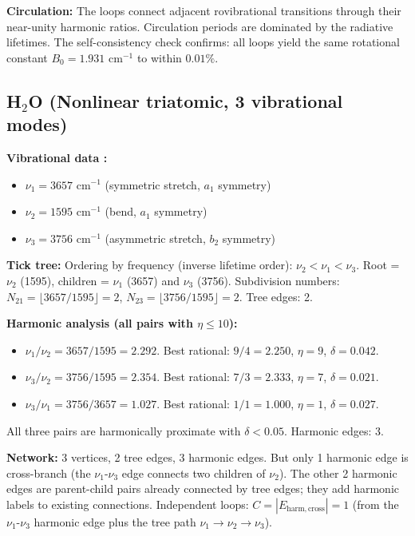 \documentclass[11pt,twocolumn,a4paper]{article}
\theoremstyle{definition}
\theoremstyle{remark}
\begin{document}
\textbf{Circulation:} The loops connect adjacent rovibrational transitions through their near-unity harmonic ratios. Circulation periods are dominated by the radiative lifetimes. The self-consistency check confirms: all loops yield the same rotational constant $B_0 = 1.931$ cm$^{-1}$ to within $0.01\%$.

\subsection{H$_2$O (Nonlinear triatomic, 3 vibrational modes)}

\textbf{Vibrational data \citep{shimanouchi1972, nist_webbook}:}
\begin{itemize}[nosep]
\item $\nu_1 = 3657$ cm$^{-1}$ (symmetric stretch, $a_1$ symmetry)
\item $\nu_2 = 1595$ cm$^{-1}$ (bend, $a_1$ symmetry)
\item $\nu_3 = 3756$ cm$^{-1}$ (asymmetric stretch, $b_2$ symmetry)
\end{itemize}

\textbf{Tick tree:} Ordering by frequency (inverse lifetime order): $\nu_2 < \nu_1 < \nu_3$. Root = $\nu_2$ (1595), children = $\nu_1$ (3657) and $\nu_3$ (3756). Subdivision numbers: $N_{21} = \lfloor 3657/1595 \rfloor = 2$, $N_{23} = \lfloor 3756/1595 \rfloor = 2$. Tree edges: 2.

\textbf{Harmonic analysis (all pairs with $\eta \leq 10$):}

\begin{itemize}[nosep]
\item $\nu_1/\nu_2 = 3657/1595 = 2.292$. Best rational: $9/4 = 2.250$, $\eta = 9$, $\delta = 0.042$.
\item $\nu_3/\nu_2 = 3756/1595 = 2.354$. Best rational: $7/3 = 2.333$, $\eta = 7$, $\delta = 0.021$.
\item $\nu_3/\nu_1 = 3756/3657 = 1.027$. Best rational: $1/1 = 1.000$, $\eta = 1$, $\delta = 0.027$.
\end{itemize}

All three pairs are harmonically proximate with $\delta < 0.05$. Harmonic edges: 3.

\textbf{Network:} 3 vertices, 2 tree edges, 3 harmonic edges. But only 1 harmonic edge is cross-branch (the $\nu_1$-$\nu_3$ edge connects two children of $\nu_2$). The other 2 harmonic edges are parent-child pairs already connected by tree edges; they add harmonic labels to existing connections. Independent loops: $C = |E_{\mathrm{harm,cross}}| = 1$ (from the $\nu_1$-$\nu_3$ harmonic edge plus the tree path $\nu_1 \to \nu_2 \to \nu_3$).
\end{document}
